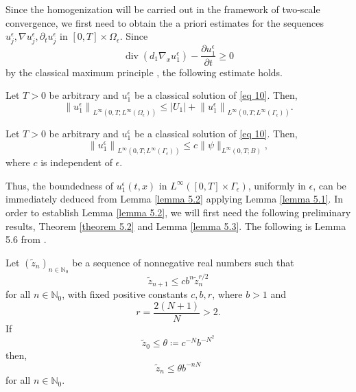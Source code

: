 Since the homogenization will be carried out in the framework of two-scale convergence, we first need to obtain the a priori estimates for the sequences $u_{j}^{\epsilon}, \nabla u_{j}^{\epsilon}, \partial_{t} u_{j}^{\epsilon}$ in $[0, T] \times \Omega_{\epsilon}$.
Since
$$
\operatorname{div}\left(d_{1} \nabla_{x} u_{1}^{\epsilon}\right)-\frac{\partial u_{1}^{\epsilon}}{\partial t} \geq 0
$$
by the classical maximum principle \cite{Protter_Weinberger_1984}, the following estimate holds.
\begin{lemma} Let $T>0$ be arbitrary and $u_{1}^{\epsilon}$ be a classical solution of \eqref{eq 10}. Then,
\begin{equation} \left\|u_{1}^{\epsilon}\right\|_{L^{\infty}\left(0, T ; L^{\infty}\left(\Omega_{\epsilon}\right)\right)} \leq\left|U_{1}\right|+\left\|u_{1}^{\epsilon}\right\|_{L^{\infty}\left(0, T ; L^{\infty}\left(\Gamma_{\epsilon}\right)\right)}. 
\label{eq 20}\end{equation}
\label{lemma 5.1}\end{lemma}
\begin{lemma} Let $T>0$ be arbitrary and $u_{1}^{\epsilon}$ be a classical solution of \eqref{eq 10}. Then,
\begin{equation}
    \left\|u_{1}^{\epsilon}\right\|_{L^{\infty}\left(0, T ; L^{\infty}\left(\Gamma_{\epsilon}\right)\right)} \leq c\|\psi\|_{L^{\infty}(0, T ; B)},
\label{eq 21}\end{equation}where $c$ is independent of $\epsilon$.
\label{lemma 5.2}\end{lemma}
Thus, the boundedness of $u_{1}^{\epsilon}(t, x)$ in $L^{\infty}\left([0, T] \times \Gamma_{\epsilon}\right)$, uniformly in $\epsilon$, can be immediately deduced from Lemma \eqref{lemma 5.2} applying Lemma \eqref{lemma 5.1}.
In order to establish Lemma \eqref{lemma 5.2}, we will first need the following preliminary results, Theorem \eqref{theorem 5.2} and Lemma \eqref{lemma 5.3}.
The following is Lemma 5.6 from \cite{Ladyzenskaja_Solonnikov_Uralceva_1968}.
\begin{lemma}Let $\left(\tilde{z}_{n}\right)_{n \in \mathbb{N}_{0}}$ be a sequence of nonnegative real numbers such that
\begin{equation}
    \tilde{z}_{n+1} \leq c b^{n} \tilde{z}_{n}^{r / 2}   
    \label{eq 22}
\end{equation}
for all $n \in \mathbb{N}_{0}$, with fixed positive constants $c, b, r$, where $b>1$ and
$$
    r=\frac{2(N+1)}{N}>2 .
$$
If
\begin{equation}
    \tilde{z}_{0} \leq \theta\coloneqq c^{-N} b^{-N^{2}}
\label{eq 23}
\end{equation}
then,
\begin{equation}
    \tilde{z}_{n} \leq \theta b^{-n N}
\label{eq 24}
\end{equation}
for all $n \in \mathbb{N}_{0}$.
\label{lemma 5.3}
\end{lemma}
